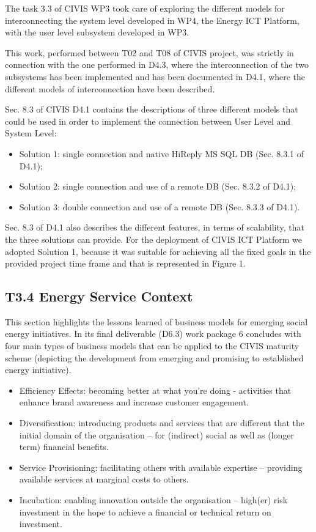 The task 3.3 of CIVIS WP3 took care of exploring the different models for interconnecting the system level developed in WP4, the Energy ICT Platform, with the user level subsystem developed in WP3.

This work, performed between T02 and T08 of CIVIS project, was strictly in connection with the one performed in D4.3, where the interconnection of the two subsystems has been implemented and has been documented in D4.1, where the different models of interconnection have been described.

Sec. 8.3 of CIVIS D4.1 contains the descriptions of three different models that could be used in order to implement the connection between User Level and System Level:

\begin{itemize}
\item Solution 1: single connection and native HiReply MS SQL DB (Sec. 8.3.1 of D4.1);
\item Solution 2: single connection and use of a remote DB (Sec. 8.3.2 of D4.1);
\item Solution 3: double connection and use of a remote DB (Sec. 8.3.3 of D4.1).
\end{itemize}

Sec. 8.3 of D4.1 also describes the different features, in terms of scalability, that the three solutions can provide. For the deployment of CIVIS ICT Platform we adopted Solution 1, because it was suitable for achieving all the fixed goals in the provided project time frame and that is represented in Figure 1.

\subsection{T3.4 Energy Service Context}

This section highlights the lessons learned of business models for emerging social energy initiatives.
In its final deliverable (D6.3) work package 6 concludes with four main types of business models that can be applied to the CIVIS maturity scheme (depicting the development from emerging and promising to established energy initiative). 

\begin{itemize}
\item Efficiency Effects: becoming better at what you're doing - activities that enhance brand awareness and increase customer engagement.
\item Diversification: introducing products and services that are different that the initial domain of the organisation -- for (indirect) social as well as (longer term) financial benefits. 
\item Service Provisioning: facilitating others with available expertise -- providing available services at marginal costs to others.
\item Incubation: enabling innovation outside the organisation -- high(er) risk investment in the hope to achieve a financial or technical return on investment. 
\end{itemize}

